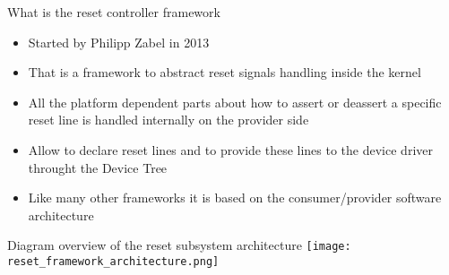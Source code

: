 \documentclass{beamer}
\begin{document}
\begin{frame}{What is the reset controller framework}
	\begin{itemize}
		\item Started by Philipp Zabel in 2013
		\item That is a framework to abstract reset signals handling inside the kernel
		\item All the platform dependent parts about how to assert or deassert a specific reset line is handled internally on the provider side
		\item Allow to declare reset lines and to provide these lines to the device driver throught the Device Tree
		\item Like many other frameworks it is based on the consumer/provider software architecture
	\end{itemize}
\end{frame}

\begin{frame}{Diagram overview of the reset subsystem architecture}
	\centering
	\texttt{[image: reset\_framework\_architecture.png]}
\end{frame}
\end{document}
